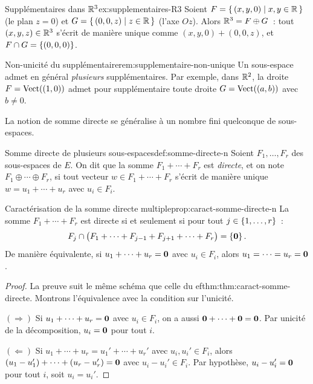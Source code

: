 \begin{example}{Supplémentaires dans ${\mathbb{R}}^3$}{ex:supplementaires-R3}
  Soient
  $F=\left\{\,(x,y,0)\;\middle|\;x,y\in{\mathbb{R}}\,\right\}$ (le plan $z=0$) et
  $G=\left\{\,(0,0,z)\;\middle|\;z\in{\mathbb{R}}\,\right\}$ (l'axe $Oz$). Alors
  ${\mathbb{R}}^3=F\oplus G$~: tout $(x,y,z)\in{\mathbb{R}}^3$ s'écrit de manière unique
  comme $(x,y,0)+(0,0,z)$, et $F\cap G=\left\{(0,0,0)\right\}$.
\end{example}

\begin{remark}{Non-unicité du supplémentaire}{rem:supplementaire-non-unique}
  Un sous-espace admet en général \emph{plusieurs} supplémentaires.
  Par exemple, dans ${\mathbb{R}}^2$, la droite $F=\operatorname{Vect}((1,0))$ admet pour
  supplémentaire toute droite $G=\operatorname{Vect}((a,b))$ avec $b\neq 0$.
\end{remark}

La notion de somme directe se généralise à un nombre fini quelconque de
sous-espaces.

\begin{definition}{Somme directe de plusieurs sous-espaces}{def:somme-directe-n}
  Soient $F_1,\ldots,F_r$ des sous-espaces de $E$. On dit que la somme
  $F_1+\cdots+F_r$ est \emph{directe}, et on note
  $F_1\oplus\cdots\oplus F_r$, si tout vecteur $w\in F_1+\cdots+F_r$
  s'écrit de manière unique $w=u_1+\cdots+u_r$ avec $u_i\in F_i$.
\end{definition}

\begin{proposition}{Caractérisation de la somme directe multiple}{prop:caract-somme-directe-n}
  La somme $F_1+\cdots+F_r$ est directe si et seulement si pour tout
  $j\in\left\{1,\ldots,r\right\}$~:
  \[
    F_j \cap \bigl(F_1+\cdots+F_{j-1}+F_{j+1}+\cdots+F_r\bigr) =
    \left\{\mathbf{0}\right\}.
  \]
  De manière équivalente, si $u_1+\cdots+u_r=\mathbf{0}$ avec $u_i\in F_i$,
  alors $u_1=\cdots=u_r=\mathbf{0}$.
\end{proposition}

\begin{proof}
  La preuve suit le même schéma que celle du 
ef{thm:thm:caract-somme-directe}.
  Montrons l'équivalence avec la condition sur l'unicité.

  $(\Rightarrow)$ Si $u_1+\cdots+u_r=\mathbf{0}$ avec $u_i\in F_i$, on a
  aussi $\mathbf{0}+\cdots+\mathbf{0}=\mathbf{0}$. Par unicité de la
  décomposition, $u_i=\mathbf{0}$ pour tout $i$.

  $(\Leftarrow)$ Si $u_1+\cdots+u_r=u_1'+\cdots+u_r'$ avec
  $u_i,u_i'\in F_i$, alors $(u_1-u_1')+\cdots+(u_r-u_r')=\mathbf{0}$
  avec $u_i-u_i'\in F_i$. Par hypothèse, $u_i-u_i'=\mathbf{0}$ pour tout
  $i$, soit $u_i=u_i'$.
\end{proof}

